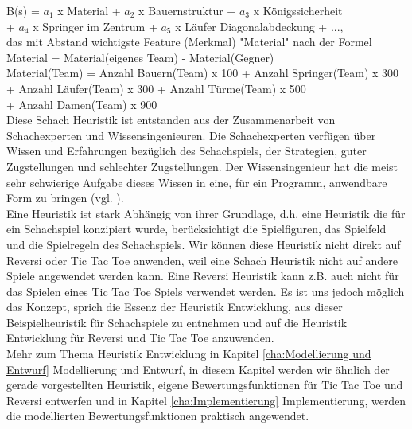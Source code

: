 B(s) = $a_1$ x Material +  $a_2$ x Bauernstruktur + $a_3$ x Königssicherheit \\
\tab \tab + $a_4$ x Springer im Zentrum + $a_5$ x Läufer Diagonalabdeckung + ..., \\ 

das mit Abstand wichtigste Feature (Merkmal) "Material" nach der Formel \\

\tab \tab Material = Material(eigenes Team) - Material(Gegner) \\

Material(Team) = Anzahl Bauern(Team) x 100 + Anzahl Springer(Team) x 300 \\
\tab \tab \tab + Anzahl Läufer(Team) x 300 + Anzahl Türme(Team) x 500 \\
\tab \tab \tab + Anzahl Damen(Team) x 900 \\

Diese Schach Heuristik ist entstanden aus der Zusammenarbeit von Schachexperten und Wissensingenieuren. Die Schachexperten verfügen über Wissen und Erfahrungen bezüglich des Schachspiels, der Strategien, guter Zugstellungen und schlechter Zugstellungen. Der Wissensingenieur hat die meist sehr schwierige Aufgabe dieses Wissen in eine, für ein Programm, anwendbare Form zu bringen (vgl. \cite[118]{Ertel}). \\

Eine Heuristik ist stark Abhängig von ihrer Grundlage, d.h. eine Heuristik die für ein Schachspiel konzipiert wurde, berücksichtigt die Spielfiguren, das Spielfeld und die Spielregeln des Schachspiels. Wir können diese Heuristik nicht direkt auf Reversi oder Tic Tac Toe anwenden, weil eine Schach Heuristik nicht auf andere Spiele angewendet werden kann. Eine Reversi Heuristik kann z.B. auch nicht für das Spielen eines Tic Tac Toe Spiels verwendet werden. Es ist uns jedoch möglich das Konzept, sprich die Essenz der Heuristik Entwicklung, aus dieser Beispielheuristik für Schachspiele zu entnehmen und auf die Heuristik Entwicklung für Reversi und Tic Tac Toe anzuwenden. \\

Mehr zum Thema Heuristik Entwicklung in Kapitel \ref{cha:Modellierung und Entwurf} Modellierung und Entwurf, in diesem Kapitel werden wir ähnlich der gerade vorgestellten Heuristik, eigene Bewertungsfunktionen für Tic Tac Toe und Reversi entwerfen und in Kapitel \ref{cha:Implementierung} Implementierung, werden die modellierten Bewertungsfunktionen praktisch angewendet. \\

